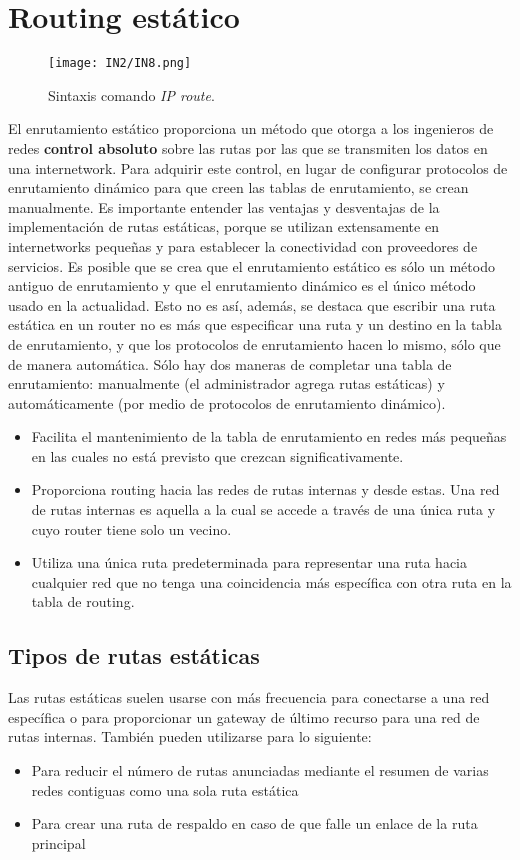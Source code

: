\documentclass[
	12pt, %
	fleqn, %
	a4paper, %
	oneside, %
]{LegrandOrangeBook}
\begin{document}
\section{Routing estático}
\begin{figure}[H]
\centering
\texttt{[image: IN2/IN8.png]}
\caption{Sintaxis comando \textit{IP route}.}
\end{figure}
El enrutamiento estático proporciona un método que otorga a los ingenieros de redes \textbf{control absoluto} sobre las rutas por las que se transmiten los datos en una internetwork. Para adquirir este control, en lugar de configurar protocolos de enrutamiento dinámico para que creen las tablas de enrutamiento, se crean manualmente. Es importante entender las ventajas y desventajas de la implementación de rutas estáticas, porque se utilizan extensamente en internetworks pequeñas y para establecer la conectividad con proveedores de servicios. Es posible que se crea que el enrutamiento estático es sólo un método antiguo de enrutamiento y que el enrutamiento dinámico es el único método usado en la actualidad. Esto no es así, además, se destaca que escribir una ruta estática en un router no es más que especificar una ruta y un destino en la tabla de enrutamiento, y que los protocolos de enrutamiento hacen lo mismo, sólo que de manera automática. Sólo hay dos maneras de completar una tabla de enrutamiento: manualmente (el administrador agrega rutas estáticas) y automáticamente (por medio de protocolos de enrutamiento dinámico). 
\begin{itemize}
\item Facilita el mantenimiento de la tabla de enrutamiento en redes más pequeñas en las cuales no está previsto que crezcan significativamente.
\item Proporciona routing hacia las redes de rutas internas y desde estas. Una red de rutas internas es aquella a la cual se accede a través de una única ruta y cuyo router tiene solo un vecino.
\item Utiliza una única ruta predeterminada para representar una ruta hacia cualquier red que no tenga una coincidencia más específica con otra ruta en la tabla de routing.
\end{itemize}
\subsection{Tipos de rutas estáticas}
Las rutas estáticas suelen usarse con más frecuencia para conectarse a una red específica o para proporcionar un gateway de último recurso para una red de rutas internas. También pueden utilizarse para lo siguiente:
\begin{itemize}
\item Para reducir el número de rutas anunciadas mediante el resumen de varias redes contiguas como una sola ruta estática
\item Para crear una ruta de respaldo en caso de que falle un enlace de la ruta principal
\end{itemize}
\end{document}
